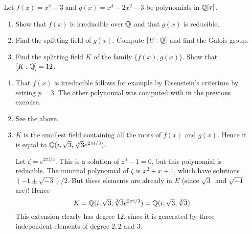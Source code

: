 \documentclass[11pt, english]{article}
\begin{document}
\begin{exc}[Eksamen 2010, 3]
Let $f(x)=x^3-3$ and $g(x)=x^4-2x^2-3$ be polynomials in $\mathbb{Q}[x]$.
\begin{enumerate}
	\item Show that $f(x)$ is irreducible over $\mathbb{Q}$ and that $g(x)$ is reducible.
	\item Find the splitting field of $g(x)$. Compute $[E:\mathbb{Q}]$ and find the Galois group. 
	\item Find the splitting field $K$ of the family $\{ f(x), g(x) \} $. Show that $[K:\mathbb{Q}]=12$.
\end{enumerate}
\end{exc}
\begin{sol}
\begin{enumerate}
	\item That $f(x)$ is irreducible follows for example by Eisenstein's criterium by setting $p=3$. The other polynomial was computed with in the previous exercise.
	\item See the above.
	\item $K$ is the smallest field containing all the roots of $f(x)$ and $g(x)$. Hence it is equal to $\mathbb{Q}(i,\sqrt 3, \sqrt[3]{3}e^{2 \pi i/3})$.

	Let $\zeta = e^{2 \pi i/3}$. This is a solution of $z^3-1=0$, but this polynomial is reducible. The minimal polynomial of $\zeta$ is $x^2+x+1$, which have solutions $(-1 \pm \sqrt{-3})/2$. But these elements are already in $E$ (since $\sqrt 3$ and $\sqrt {-1}$ are)! Hence
	$$
	K = \mathbb{Q}(i, \sqrt 3, \sqrt[3]{3}e^{2\pi i/3}) = \mathbb{Q}(i, \sqrt 3, \sqrt[3]{3}).
	$$
	This extension clearly has degree $12$, since it is generated by three independent elements of degree $2,2$ and $3$.
\end{enumerate}

\end{sol}
\end{document}
